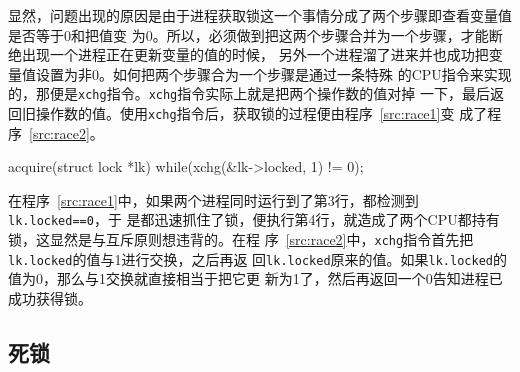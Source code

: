 \documentclass{swfuthesism}
\begin{document}
显然，问题出现的原因是由于进程获取锁这一个事情分成了两个步骤即查看变量值是否等于0和把值变
为0。所以，必须做到把这两个步骤合并为一个步骤，才能断绝出现一个进程正在更新变量的值的时候，
另外一个进程溜了进来并也成功把变量值设置为非0。如何把两个步骤合为一个步骤是通过一条特殊
的CPU指令来实现的，那便是\texttt{xchg}指令。\texttt{xchg}指令实际上就是把两个操作数的值对掉
一下，最后返回旧操作数的值。使用\texttt{xchg}指令后，获取锁的过程便由程序~\ref{src:race1}变
成了程序~\ref{src:race2}。

\begin{listing}[H]
  \begin{codeblock}
\begin{ccode}
acquire(struct lock *lk){
  while(xchg(&lk->locked, 1) != 0);
}
\end{ccode}
  \end{codeblock}
  \label{src:race2}
\end{listing}

在程序~\ref{src:race1}中，如果两个进程同时运行到了第3行，都检测到\texttt{lk.locked==0}，于
是都迅速抓住了锁，便执行第4行，就造成了两个CPU都持有锁，这显然是与互斥原则想违背的。在程
序~\ref{src:race2}中，\texttt{xchg}指令首先把\texttt{lk.locked}的值与1进行交换，之后再返
回\texttt{lk.locked}原来的值。如果\texttt{lk.locked}的值为0，那么与1交换就直接相当于把它更
新为1了，然后再返回一个0告知进程已成功获得锁。



\subsection{死锁}
\end{document}
